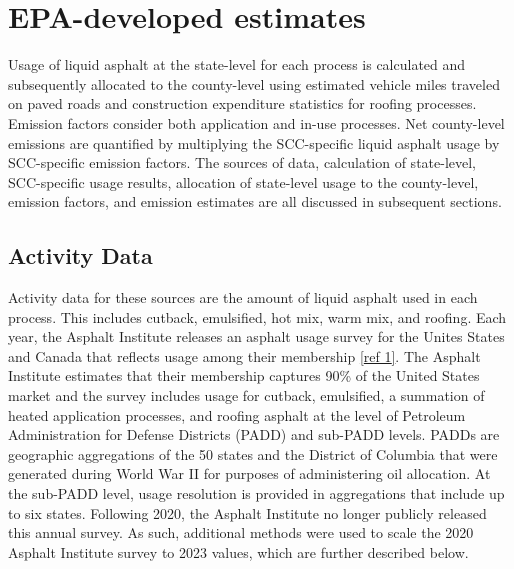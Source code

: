 \documentclass[
  11pt,
  oneside]{book}
\begin{document}
\section{EPA-developed estimates}\label{epa-developed-estimates-1}

Usage of liquid asphalt at the state-level for each process is calculated and subsequently allocated to the county-level using estimated vehicle miles traveled on paved roads and construction expenditure statistics for roofing processes. Emission factors consider both application and in-use processes. Net county-level emissions are quantified by multiplying the SCC-specific liquid asphalt usage by SCC-specific emission factors. The sources of data, calculation of state-level, SCC-specific usage results, allocation of state-level usage to the county-level, emission factors, and emission estimates are all discussed in subsequent sections.

\subsection{Activity Data}\label{activity-data-1}

Activity data for these sources are the amount of liquid asphalt used in each process. This includes cutback, emulsified, hot mix, warm mix, and roofing. Each year, the Asphalt Institute releases an asphalt usage survey for the Unites States and Canada that reflects usage among their membership \hyperref[ref-1]{{[}ref 1{]}}. The Asphalt Institute estimates that their membership captures 90\% of the United States market and the survey includes usage for cutback, emulsified, a summation of heated application processes, and roofing asphalt at the level of Petroleum Administration for Defense Districts (PADD) and sub-PADD levels. PADDs are geographic aggregations of the 50 states and the District of Columbia that were generated during World War II for purposes of administering oil allocation. At the sub-PADD level, usage resolution is provided in aggregations that include up to six states. Following 2020, the Asphalt Institute no longer publicly released this annual survey. As such, additional methods were used to scale the 2020 Asphalt Institute survey to 2023 values, which are further described below.
\end{document}
